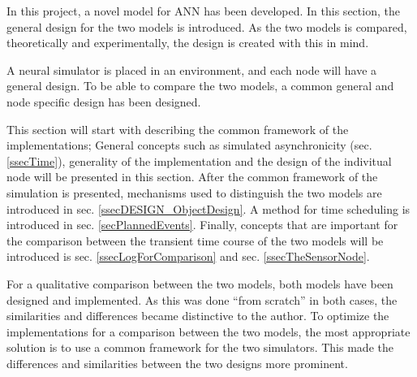 	In this project, a novel model for ANN has been developed.  %
	In this section, the general design for the two models is introduced.
	As the two models is compared, theoretically and experimentally, the design is created with this in mind.

	A neural simulator is placed in an environment, and each node will have a general design.
	To be able to compare the two models, a common general and node specific design has been designed.

	This section will start with describing the common framework of the implementations; 
		General concepts such as simulated asynchronicity (sec.\ref{ssecTime}), generality of the implementation and the design of the indivitual node will be presented in this section. 
	After the common framework of the simulation is presented,
		 mechanisms used to distinguish the two models are introduced in sec. \ref{ssecDESIGN_ObjectDesign}.
	A method for time scheduling is introduced in sec. \ref{secPlannedEvents}.
	Finally, concepts that are important for the comparison between the transient time course of the two models will be introduced is sec. \ref{ssecLogForComparison} and sec. \ref{ssecTheSensorNode}.


	For a qualitative comparison between the two models, both models have been designed and implemented. 
	As this was done ``from scratch'' in both cases, the similarities and differences became distinctive to the author. 
	To optimize the implementations for a comparison between the two models, the most appropriate solution is to use a common framework for the two simulators.
	This made the differences and similarities between the two designs more prominent.





	
